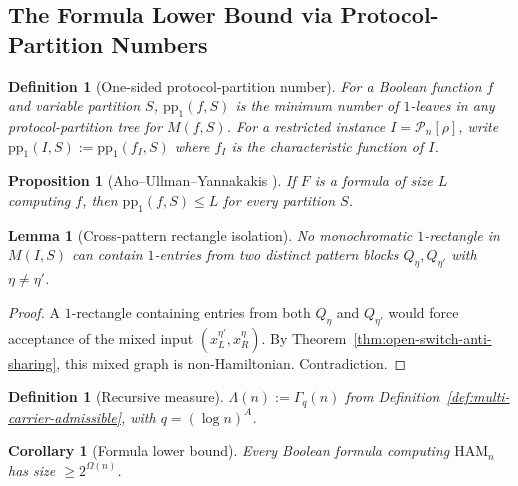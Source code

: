 \documentclass[11pt]{article}
\newtheorem{lemma}[theorem]{Lemma}
\newtheorem{proposition}[theorem]{Proposition}
\newtheorem{corollary}[theorem]{Corollary}
\newtheorem{definition}[theorem]{Definition}
\newcommand{\Ham}{\mathrm{HAM}}
\begin{document}
\subsection{The Formula Lower Bound via Protocol-Partition Numbers}

\begin{definition}[One-sided protocol-partition number]
\label{def:pp1}
For a Boolean function $f$ and variable partition $S$, $\mathrm{pp}_1(f,S)$
is the minimum number of $1$-leaves in any protocol-partition tree for $M(f,S)$.
For a restricted instance $I = \mathcal{P}_n[\rho]$, write
$\mathrm{pp}_1(I, S) := \mathrm{pp}_1(f_I, S)$ where $f_I$ is the
characteristic function of $I$.
\end{definition}

\begin{proposition}[Aho--Ullman--Yannakakis {\cite{AUY83}}]
\label{prop:auy}
If $F$ is a formula of size $L$ computing $f$, then
$\mathrm{pp}_1(f, S) \le L$ for every partition $S$.
\end{proposition}

\begin{lemma}[Cross-pattern rectangle isolation]
\label{lem:rect-isolation}
No monochromatic $1$-rectangle in $M(I, S)$ can contain $1$-entries from
two distinct pattern blocks $Q_\eta, Q_{\eta'}$ with $\eta \neq \eta'$.
\end{lemma}

\begin{proof}
A $1$-rectangle containing entries from both $Q_\eta$ and $Q_{\eta'}$
would force acceptance of the mixed input $(x_L^{\eta'}, x_R^\eta)$.
By Theorem~\ref{thm:open-switch-anti-sharing}, this mixed graph is
non-Hamiltonian.  Contradiction.
\end{proof}

\begin{definition}[Recursive measure]
\label{def:lambda}
$\Lambda(n) := \Gamma_q(n)$ from Definition~\ref{def:multi-carrier-admissible},
with $q = (\log n)^A$.
\end{definition}

\begin{corollary}[Formula lower bound]
\label{cor:formula-lower-bound}
Every Boolean formula computing $\Ham_n$ has size $\ge 2^{\Omega(n)}$.
\end{corollary}
\end{document}
